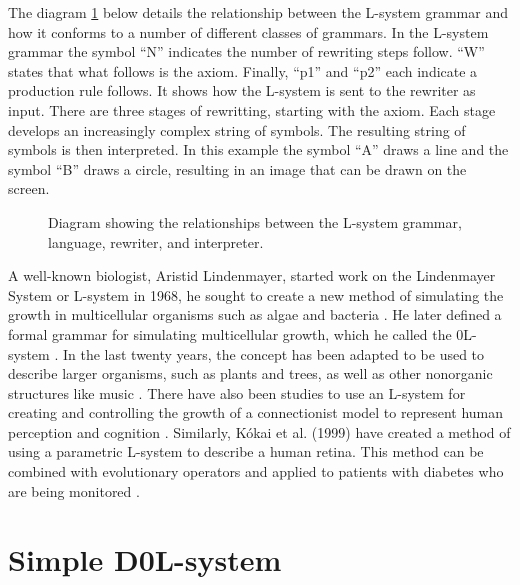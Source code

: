 The diagram \ref{L-system relationships} below details the relationship between the L-system grammar and how it conforms to a number of different classes of grammars. In the L-system grammar the symbol ``N'' indicates the number of rewriting steps follow. ``W'' states that what follows is the axiom. Finally, ``p1'' and ``p2'' each indicate a production rule follows. It shows how the L-system is sent to the rewriter as input. There are three stages of rewritting, starting with the axiom. Each stage develops an increasingly complex string of symbols. The resulting string of symbols is then interpreted. In this example the symbol ``A'' draws a line and the symbol ``B'' draws a circle, resulting in an image that can be drawn on the screen.

\begin{figure}[htbp]
	{\centering
		\setlength{\fboxrule}{1pt}
		\vspace{7px}
		\caption{Diagram showing the relationships between the L-system grammar, language, rewriter, and interpreter.} \label{L-system relationships}
	}
\end{figure}
\FloatBarrier

\noindent
A well-known biologist, Aristid Lindenmayer, started work on the Lindenmayer System or L-system in 1968, he sought to create a new method of simulating the growth in multicellular organisms such as algae and bacteria \cite{lindenmayer1968mathematical}. He later defined a formal grammar for simulating multicellular growth, which he called the 0L-system \cite {lindenmayer1971developmental}. In the last twenty years, the concept has been adapted to be used to describe larger organisms, such as plants and trees, as well as other nonorganic structures like music \cite{worth2005growing}. There have also been studies to use an L-system for creating and controlling the growth of a connectionist model to represent human perception and cognition \cite{vaario1991connectionist}. Similarly, K{\'o}kai et al. (1999) have created a method of using a parametric L-system to describe a human retina. This method can be combined with evolutionary operators and applied to patients with diabetes who are being monitored \cite{kokai1999parametric}.

\section{Simple D0L-system} \label{Simple DOL-systems}

